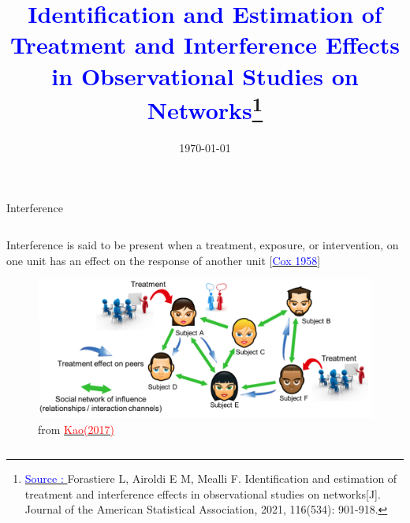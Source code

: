 \documentclass[notes,11pt, aspectratio=169]{beamer}
\title{\textcolor{blue}{Identification and Estimation of Treatment and Interference Effects in Observational Studies on Networks}\footnote{\href{https://www.tandfonline.com/doi/full/10.1080/01621459.2020.1768100?scroll=top&needAccess=true}{\textcolor{blue}{Source : }}Forastiere L, Airoldi E M, Mealli F. Identification and estimation of treatment and interference effects in observational studies on networks[J]. Journal of the American Statistical Association, 2021, 116(534): 901-918.}}
\author{}
\institute{\small{Nankai University}}
\date{\today}
\begin{document}
\begin{frame}
\maketitle

\end{frame}


\begin{frame}{Interference}
\begin{columns}[T] %
\begin{column}{\textwidth}
  \begin{wideitemize}
  \item  Interference is said to be present when a treatment, exposure, or intervention, on one unit has an effect on the response of another unit [\href{https://philpapers.org/rec/COXPOE}{\textcolor{blue}{Cox 1958}}]  
  \begin{figure}[h]
      \centering
      \includegraphics[scale=0.45]{figure1.png}
      \caption{from \href{https://arxiv.org/abs/1708.08522}{\textcolor{red}{Kao(2017)}}}
      \label{fig:fig1}
  \end{figure}
  \end{wideitemize}
\end{column}%
\end{columns}
\end{frame}
\end{document}
